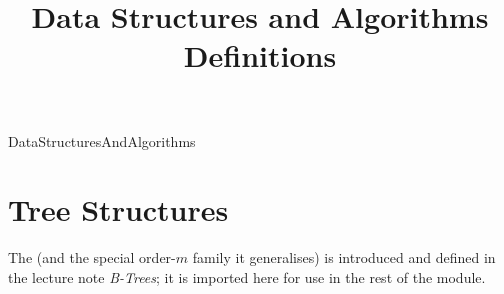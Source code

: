 \documentclass[hidelinks]{article}
\title{Data Structures and Algorithms Definitions}
\author{}
\date{}
\begin{document}
\maketitle

\begin{smodule}[title={Data Structures and Algorithms}]{DataStructuresAndAlgorithms}

    \section{Tree Structures}

    The  (and the special order-$m$ family it generalises) is introduced and defined in the lecture note \emph{B-Trees}; it is imported here for use in the rest of the module.

\end{smodule}
\end{document}
